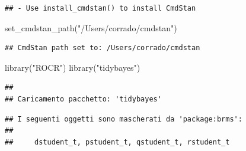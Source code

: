 \documentclass[
]{article}
\newenvironment{Shaded}{\begin{snugshade}}{\end{snugshade}}
\newcommand{\FunctionTok}[1]{\textcolor[rgb]{0.00,0.00,0.00}{#1}}
\newcommand{\NormalTok}[1]{#1}
\newcommand{\StringTok}[1]{\textcolor[rgb]{0.31,0.60,0.02}{#1}}
\begin{document}
\begin{verbatim}
## - Use install_cmdstan() to install CmdStan
\end{verbatim}

\begin{Shaded}
\begin{Highlighting}[]
\FunctionTok{set\_cmdstan\_path}\NormalTok{(}\StringTok{"/Users/corrado/cmdstan"}\NormalTok{)}
\end{Highlighting}
\end{Shaded}

\begin{verbatim}
## CmdStan path set to: /Users/corrado/cmdstan
\end{verbatim}

\begin{Shaded}
\begin{Highlighting}[]
\FunctionTok{library}\NormalTok{(}\StringTok{"ROCR"}\NormalTok{)}
\FunctionTok{library}\NormalTok{(}\StringTok{"tidybayes"}\NormalTok{)}
\end{Highlighting}
\end{Shaded}

\begin{verbatim}
## 
## Caricamento pacchetto: 'tidybayes'
\end{verbatim}

\begin{verbatim}
## I seguenti oggetti sono mascherati da 'package:brms':
## 
##     dstudent_t, pstudent_t, qstudent_t, rstudent_t
\end{verbatim}
\end{document}
